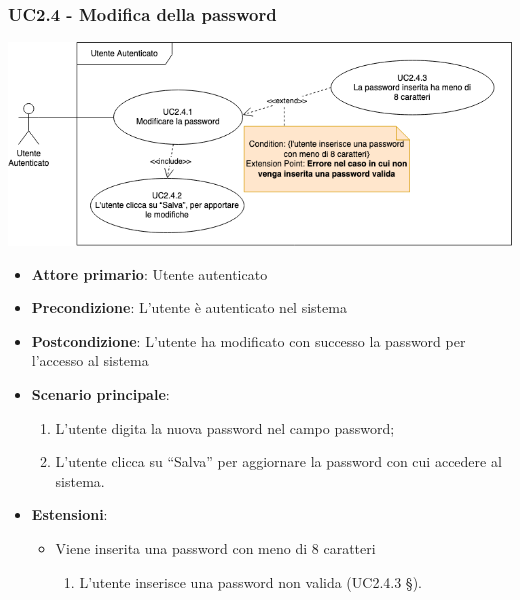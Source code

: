 \subsubsection{UC2.4 - Modifica della password}
\begin{center}
\includegraphics[scale=0.5]{UC_images/UC2_4.png}
\end{center}
\begin{itemize}
\item \textbf{Attore primario}: Utente autenticato
\item \textbf{Precondizione}: L’utente è autenticato nel sistema
\item \textbf{Postcondizione}: L’utente ha modificato con successo la password per l’accesso al sistema

\item \textbf{Scenario principale}:
\begin{enumerate}
\item L’utente digita la nuova password nel campo password;
\item L’utente clicca su “Salva” per aggiornare la password con cui accedere al sistema.
\end{enumerate}

\item \textbf{Estensioni}:
\begin{itemize}
\item Viene inserita una password con meno di 8 caratteri
\begin{enumerate}
	\item L'utente inserisce una password non valida (UC2.4.3 §).
\end{enumerate}
\end{itemize}
\end{itemize}